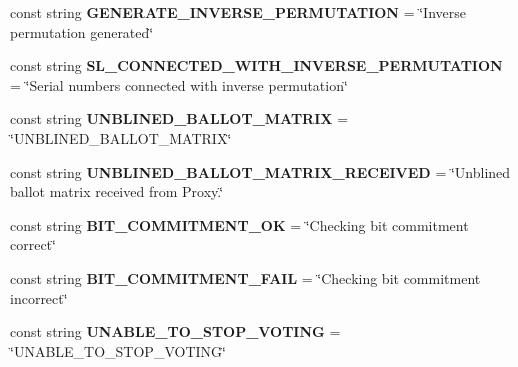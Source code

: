 \begin{DoxyCompactItemize}
\item 
\hypertarget{class_election_authority_1_1_constants_ad3c8d542cac9f7bf74257b153f1c31b2}{}const string {\bfseries G\+E\+N\+E\+R\+A\+T\+E\+\_\+\+I\+N\+V\+E\+R\+S\+E\+\_\+\+P\+E\+R\+M\+U\+T\+A\+T\+I\+O\+N} = \char`\"{}Inverse permutation generated\char`\"{}\label{class_election_authority_1_1_constants_ad3c8d542cac9f7bf74257b153f1c31b2}

\item 
\hypertarget{class_election_authority_1_1_constants_a9ee35e14bf4be6841cc7a2194bcdbe66}{}const string {\bfseries S\+L\+\_\+\+C\+O\+N\+N\+E\+C\+T\+E\+D\+\_\+\+W\+I\+T\+H\+\_\+\+I\+N\+V\+E\+R\+S\+E\+\_\+\+P\+E\+R\+M\+U\+T\+A\+T\+I\+O\+N} = \char`\"{}Serial numbers connected with inverse permutation\char`\"{}\label{class_election_authority_1_1_constants_a9ee35e14bf4be6841cc7a2194bcdbe66}

\item 
\hypertarget{class_election_authority_1_1_constants_a46b0b587a2428ead8ea3ac43e8dc0185}{}const string {\bfseries U\+N\+B\+L\+I\+N\+E\+D\+\_\+\+B\+A\+L\+L\+O\+T\+\_\+\+M\+A\+T\+R\+I\+X} = \char`\"{}U\+N\+B\+L\+I\+N\+E\+D\+\_\+\+B\+A\+L\+L\+O\+T\+\_\+\+M\+A\+T\+R\+I\+X\char`\"{}\label{class_election_authority_1_1_constants_a46b0b587a2428ead8ea3ac43e8dc0185}

\item 
\hypertarget{class_election_authority_1_1_constants_a70c65694ad2e19e9d299d5fda821bda8}{}const string {\bfseries U\+N\+B\+L\+I\+N\+E\+D\+\_\+\+B\+A\+L\+L\+O\+T\+\_\+\+M\+A\+T\+R\+I\+X\+\_\+\+R\+E\+C\+E\+I\+V\+E\+D} = \char`\"{}Unblined ballot matrix received from Proxy.\char`\"{}\label{class_election_authority_1_1_constants_a70c65694ad2e19e9d299d5fda821bda8}

\item 
\hypertarget{class_election_authority_1_1_constants_a6a129b8cd655d46f3f0269f39a91b88c}{}const string {\bfseries B\+I\+T\+\_\+\+C\+O\+M\+M\+I\+T\+M\+E\+N\+T\+\_\+\+O\+K} = \char`\"{}Checking bit commitment correct\char`\"{}\label{class_election_authority_1_1_constants_a6a129b8cd655d46f3f0269f39a91b88c}

\item 
\hypertarget{class_election_authority_1_1_constants_a27de6b3952b1ae8210f546bd80c3d411}{}const string {\bfseries B\+I\+T\+\_\+\+C\+O\+M\+M\+I\+T\+M\+E\+N\+T\+\_\+\+F\+A\+I\+L} = \char`\"{}Checking bit commitment incorrect\char`\"{}\label{class_election_authority_1_1_constants_a27de6b3952b1ae8210f546bd80c3d411}

\item 
\hypertarget{class_election_authority_1_1_constants_a53399554f937aafcea4cc3a8484d0ff9}{}const string {\bfseries U\+N\+A\+B\+L\+E\+\_\+\+T\+O\+\_\+\+S\+T\+O\+P\+\_\+\+V\+O\+T\+I\+N\+G} = \char`\"{}U\+N\+A\+B\+L\+E\+\_\+\+T\+O\+\_\+\+S\+T\+O\+P\+\_\+\+V\+O\+T\+I\+N\+G\char`\"{}\label{class_election_authority_1_1_constants_a53399554f937aafcea4cc3a8484d0ff9}


\end{DoxyCompactItemize}
